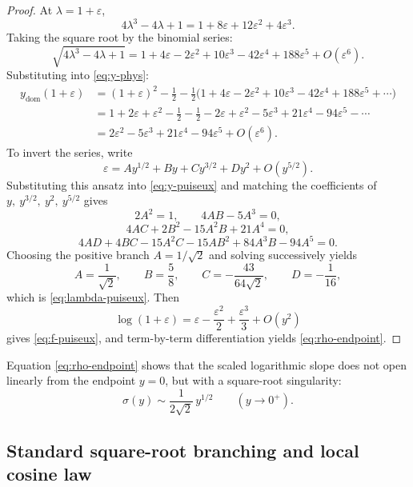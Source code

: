 \begin{proof}
At $\lambda = 1 + \varepsilon$,
\[
4\lambda^3 - 4\lambda + 1
= 1 + 8\varepsilon + 12\varepsilon^2 + 4\varepsilon^3.
\]
Taking the square root by the binomial series:
\[
\sqrt{4\lambda^3 - 4\lambda + 1}
= 1 + 4\varepsilon - 2\varepsilon^2 + 10\varepsilon^3 - 42\varepsilon^4 + 188\varepsilon^5 + O(\varepsilon^6).
\]
Substituting into \eqref{eq:y-phys}:
\begin{align*}
y_{\mathrm{dom}}(1 + \varepsilon)
&= (1 + \varepsilon)^2 - \tfrac{1}{2}
  - \tfrac{1}{2}\bigl(1 + 4\varepsilon - 2\varepsilon^2 + 10\varepsilon^3 - 42\varepsilon^4 + 188\varepsilon^5 + \cdots\bigr) \\
&= 1 + 2\varepsilon + \varepsilon^2 - \tfrac{1}{2}
  - \tfrac{1}{2} - 2\varepsilon + \varepsilon^2 - 5\varepsilon^3 + 21\varepsilon^4 - 94\varepsilon^5 - \cdots \\
&= 2\varepsilon^2 - 5\varepsilon^3 + 21\varepsilon^4 - 94\varepsilon^5 + O(\varepsilon^6).
\end{align*}
To invert the series, write
\[
\varepsilon = A y^{1/2} + B y + C y^{3/2} + D y^2 + O(y^{5/2}).
\]
Substituting this ansatz into \eqref{eq:y-puiseux} and matching the coefficients of
\(
y,\ y^{3/2},\ y^2,\ y^{5/2}
\)
gives
\[
2A^2=1,\qquad 4AB-5A^3=0,
\]
\[
4AC+2B^2-15A^2B+21A^4=0,
\]
\[
4AD+4BC-15A^2C-15AB^2+84A^3B-94A^5=0.
\]
Choosing the positive branch \(A=1/\sqrt2\) and solving successively yields
\[
A=\frac{1}{\sqrt2},\qquad
B=\frac58,\qquad
C=-\frac{43}{64\sqrt2},\qquad
D=-\frac{1}{16},
\]
which is \eqref{eq:lambda-puiseux}.
Then
\[
\log(1+\varepsilon)=\varepsilon-\frac{\varepsilon^2}{2}+\frac{\varepsilon^3}{3}+O(y^2)
\]
gives \eqref{eq:f-puiseux}, and term-by-term differentiation yields \eqref{eq:rho-endpoint}.
\end{proof}

Equation \eqref{eq:rho-endpoint} shows that the scaled logarithmic slope does not open linearly from the endpoint \(y=0\), but with a square-root singularity:
\[
\sigma(y) \sim \frac{1}{2\sqrt{2}}\,y^{1/2}
\qquad (y \to 0^+).
\]

\subsection{Standard square-root branching and local cosine law}\label{subsec:endpoint-quantization}

